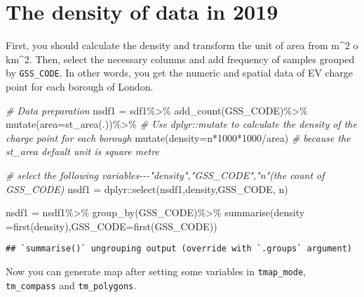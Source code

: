 \documentclass[
]{book}
\newenvironment{Shaded}{\begin{snugshade}}{\end{snugshade}}
\newcommand{\AttributeTok}[1]{\textcolor[rgb]{0.77,0.63,0.00}{#1}}
\newcommand{\CommentTok}[1]{\textcolor[rgb]{0.56,0.35,0.01}{\textit{#1}}}
\newcommand{\DecValTok}[1]{\textcolor[rgb]{0.00,0.00,0.81}{#1}}
\newcommand{\FunctionTok}[1]{\textcolor[rgb]{0.00,0.00,0.00}{#1}}
\newcommand{\NormalTok}[1]{#1}
\newcommand{\OtherTok}[1]{\textcolor[rgb]{0.56,0.35,0.01}{#1}}
\newcommand{\SpecialCharTok}[1]{\textcolor[rgb]{0.00,0.00,0.00}{#1}}
\begin{document}
\hypertarget{the-density-of-data-in-2019}{%
\section{The density of data in 2019}\label{the-density-of-data-in-2019}}

First, you should calculate the density and transform the unit of area from m\^{}2 o km\^{}2. Then, select the necessary columns and add frequency of samples grouped by \texttt{GSS\_CODE}. In other words, you get the numeric and spatial data of EV charge point for each borough of London.

\begin{Shaded}
\begin{Highlighting}[]
\CommentTok{\# Data preparation}
\NormalTok{nsdf1 }\OtherTok{=}\NormalTok{ sdf1}\SpecialCharTok{\%\textgreater{}\%}
  \FunctionTok{add\_count}\NormalTok{(GSS\_CODE)}\SpecialCharTok{\%\textgreater{}\%}
  \FunctionTok{mutate}\NormalTok{(}\AttributeTok{area=}\FunctionTok{st\_area}\NormalTok{(.))}\SpecialCharTok{\%\textgreater{}\%}
  \CommentTok{\# Use dplyr::mutate to calculate the density of the charge point for each borough}
  \FunctionTok{mutate}\NormalTok{(}\AttributeTok{density=}\NormalTok{n}\SpecialCharTok{*}\DecValTok{1000}\SpecialCharTok{*}\DecValTok{1000}\SpecialCharTok{/}\NormalTok{area)}
  \CommentTok{\# because the st\_area default unit is square metre}

\CommentTok{\# select the following variables{-}{-}{-}"density","GSS\_CODE","n"(the count of GSS\_CODE)}
\NormalTok{nsdf1 }\OtherTok{=}\NormalTok{ dplyr}\SpecialCharTok{::}\FunctionTok{select}\NormalTok{(nsdf1,density,GSS\_CODE, n)}

\NormalTok{nsdf1 }\OtherTok{=}\NormalTok{ nsdf1}\SpecialCharTok{\%\textgreater{}\%}                    
  \FunctionTok{group\_by}\NormalTok{(GSS\_CODE)}\SpecialCharTok{\%\textgreater{}\%}         
  \FunctionTok{summarise}\NormalTok{(}\AttributeTok{density =}\FunctionTok{first}\NormalTok{(density),}\AttributeTok{GSS\_CODE=}\FunctionTok{first}\NormalTok{(GSS\_CODE))}
\end{Highlighting}
\end{Shaded}

\begin{verbatim}
## `summarise()` ungrouping output (override with `.groups` argument)
\end{verbatim}

Now you can generate map after setting some variables in \texttt{tmap\_mode}, \texttt{tm\_compass} and \texttt{tm\_polygons}.
\end{document}
